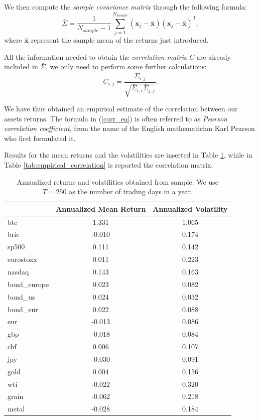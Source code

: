 We then compute the \textit{sample covariance matrix} through the following formula:
\begin{equation*}
\bar{\Sigma}  = \frac{1}{N_{sample}-1} \sum_{j=1}^{N_{sample}} (\mathbf{x}_j - \mathbf{\bar{x}}) (\mathbf{x}_j - \mathbf{\bar{x}})^T,
\end{equation*}
where $\mathbf{\bar{x}}$ represent the sample mean of the returns just introduced.
	
All the information needed to obtain the \textit{correlation matrix} $C$ are already included in $\bar{\Sigma}$, we only need to perform some further calculations:
\begin{equation}
\label{corr_eq}
	C_{i,j} = \frac{\bar{\Sigma}_{i,j}}{\sqrt{\bar{\Sigma}_{i,i} \bar{\Sigma}_{j,j}}}.
\end{equation}

We have thus obtained an empirical estimate of the correlation between our assets returns. The formula in (\ref{corr_eq}) is often referred to as \textit{Pearson correlation coefficient}, from the name of the English mathematician Karl Pearson who first formulated it.

Results for the mean returns and the volatilities are inserted in Table \ref{tab:sample_ret_vol}, while in Table \ref{tab:empirical_correlation} is reported the correlation matrix.


\begin{table}
	\small
	\centering
	\caption[Annualized mean returns and volatilities from sample]{Annualized returns and volatilities obtained from sample. We use $T = 250$ as the number of trading days in a year.}
	\label{tab:sample_ret_vol}
	\begin{tabular}{lcc}
		& Annualized Mean Return & Annualized Volatility \\
		\midrule
		btc & 1.331 & 1.065 \\
		bric & -0.010 & 0.174 \\
		sp500 & 0.111 & 0.142 \\
		eurostoxx & 0.011 & 0.223 \\
		nasdaq & 0.143 & 0.163 \\
		bond\_europe & 0.023 & 0.082 \\
		bond\_us & 0.024 & 0.032 \\
		bond\_eur & 0.022 & 0.088 \\
		eur & -0.013 & 0.086 \\
		gbp & -0.018 & 0.084 \\
		chf & 0.006 & 0.107 \\
		jpy & -0.030 & 0.091 \\
		gold & 0.004 & 0.156 \\
		wti & -0.022 & 0.320 \\
		grain & -0.062 & 0.218 \\
		metal & -0.028 & 0.184 \\
		\midrule
	\end{tabular}
\end{table}

